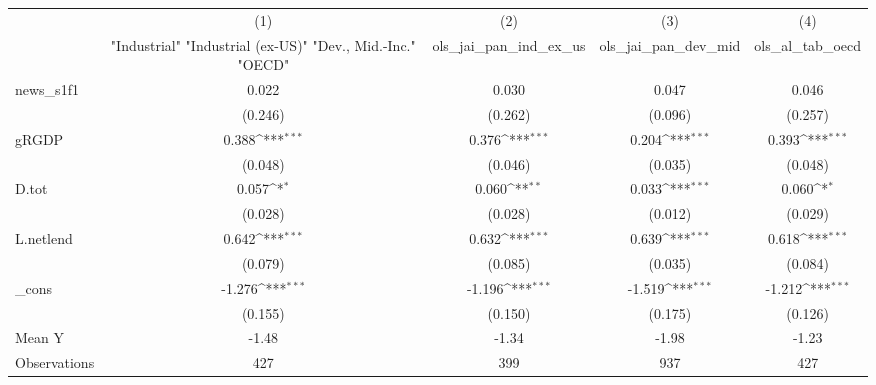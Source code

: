{
\def\sym#1{\ifmmode^{#1}\else\(^{#1}\)\fi}
\begin{tabular}{l*{4}{c}}
\toprule
            &\multicolumn{1}{c}{(1)}&\multicolumn{1}{c}{(2)}&\multicolumn{1}{c}{(3)}&\multicolumn{1}{c}{(4)}\\
            &\multicolumn{1}{c}{ "Industrial" "Industrial (ex-US)" "Dev., Mid.-Inc." "OECD" }&\multicolumn{1}{c}{ols\_jai\_pan\_ind\_ex\_us}&\multicolumn{1}{c}{ols\_jai\_pan\_dev\_mid}&\multicolumn{1}{c}{ols\_al\_tab\_oecd}\\
\midrule
news\_s1f1   &       0.022         &       0.030         &       0.047         &       0.046         \\
            &     (0.246)         &     (0.262)         &     (0.096)         &     (0.257)         \\
\addlinespace
gRGDP       &       0.388\sym{***}&       0.376\sym{***}&       0.204\sym{***}&       0.393\sym{***}\\
            &     (0.048)         &     (0.046)         &     (0.035)         &     (0.048)         \\
\addlinespace
D.tot       &       0.057\sym{*}  &       0.060\sym{**} &       0.033\sym{***}&       0.060\sym{*}  \\
            &     (0.028)         &     (0.028)         &     (0.012)         &     (0.029)         \\
\addlinespace
L.netlend   &       0.642\sym{***}&       0.632\sym{***}&       0.639\sym{***}&       0.618\sym{***}\\
            &     (0.079)         &     (0.085)         &     (0.035)         &     (0.084)         \\
\addlinespace
\_cons      &      -1.276\sym{***}&      -1.196\sym{***}&      -1.519\sym{***}&      -1.212\sym{***}\\
            &     (0.155)         &     (0.150)         &     (0.175)         &     (0.126)         \\
\midrule
Mean Y      &       -1.48         &       -1.34         &       -1.98         &       -1.23         \\
Observations&         427         &         399         &         937         &         427         \\
\bottomrule
\end{tabular}
}
